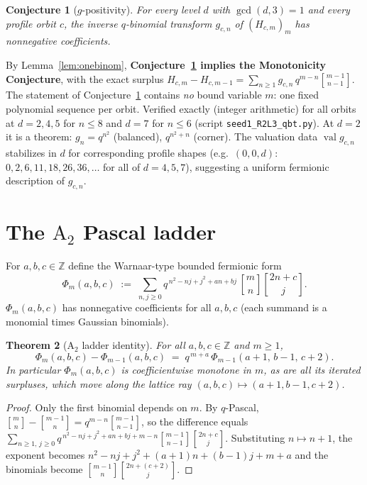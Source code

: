 \documentclass[11pt]{article}
\newtheorem{theorem}{Theorem}
\newtheorem{conjecture}[theorem]{Conjecture}
\newcommand{\qbin}[2]{\genfrac{[}{]}{0pt}{}{#1}{#2}}
\begin{document}
\begin{conjecture}[$g$-positivity]\label{con:g}
For every level $d$ with $\gcd(d,3)=1$ and every profile orbit $c$, the
inverse $q$-binomial transform $g_{c,n}$ of $(H_{c,m})_m$ has nonnegative
coefficients.
\end{conjecture}

By Lemma~\ref{lem:onebinom}, \textbf{Conjecture~\ref{con:g} implies the
Monotonicity Conjecture}, with the exact surplus
$H_{c,m}-H_{c,m-1}=\sum_{n\ge1}g_{c,n}\,q^{m-n}\qbin{m-1}{n-1}$.
The statement of Conjecture~\ref{con:g} contains \emph{no} bound variable
$m$: one fixed polynomial sequence per orbit. Verified exactly (integer
arithmetic) for all orbits at $d=2,4,5$ for $n\le 8$ and $d=7$ for $n\le6$
(script \texttt{seed1\_R2L3\_qbt.py}). At $d=2$ it is a theorem:
$g_n=q^{n^2}$ (balanced), $q^{n^2+n}$ (corner). The valuation data
$\operatorname{val} g_{c,n}$ stabilizes in $d$ for corresponding profile
shapes (e.g.\ $(0,0,d)$: $0,2,6,11,18,26,36,\dots$ for all of $d=4,5,7$),
suggesting a uniform fermionic description of $g_{c,n}$.

\section{The $\mathrm{A}_2$ Pascal ladder}

For $a,b,c\in\mathbb{Z}$ define the Warnaar-type bounded fermionic form
\[
\Phi_m(a,b,c)\;:=\;\sum_{n,j\ge 0}
q^{\,n^2-nj+j^2+an+bj}\,\qbin{m}{n}\qbin{2n+c}{j}.
\]
$\Phi_m(a,b,c)$ has nonnegative coefficients for all $a,b,c$ (each summand is
a monomial times Gaussian binomials).

\begin{theorem}[$\mathrm{A}_2$ ladder identity]\label{thm:ladder}
For all $a,b,c\in\mathbb{Z}$ and $m\ge 1$,
\[
\Phi_m(a,b,c)-\Phi_{m-1}(a,b,c)\;=\;q^{\,m+a}\,\Phi_{m-1}(a+1,\,b-1,\,c+2).
\]
In particular $\Phi_m(a,b,c)$ is coefficientwise monotone in $m$, as are all
its iterated surpluses, which move along the lattice ray
$(a,b,c)\mapsto(a+1,b-1,c+2)$.
\end{theorem}
\begin{proof}
Only the first binomial depends on $m$. By $q$-Pascal,
$\qbin{m}{n}-\qbin{m-1}{n}=q^{m-n}\qbin{m-1}{n-1}$, so the difference equals
$\sum_{n\ge1,\,j\ge0}q^{\,n^2-nj+j^2+an+bj+m-n}\qbin{m-1}{n-1}\qbin{2n+c}{j}$.
Substituting $n\mapsto n+1$, the exponent becomes
$n^2-nj+j^2+(a+1)n+(b-1)j+m+a$ and the binomials become
$\qbin{m-1}{n}\qbin{2n+(c+2)}{j}$.
\end{proof}
\end{document}

